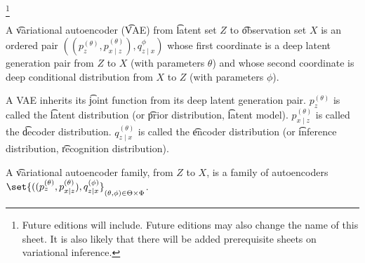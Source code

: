 
\footnote{Future editions will include. Future editions may also change the name of this sheet. It is also likely that there will be added prerequisite sheets on variational inference.}


A \t{variational autoencoder} (\t{VAE}) from \t{latent set} $Z$ to \t{observation set} $X$ is an ordered pair
$((p_{z}^{(\theta)}, p^{(\theta)}_{x \mid z}),  q^{\phi}_{z \mid x})$
whose first coordinate is a deep latent generation pair from $Z$ to $X$ (with parameters $\theta$) and whose second coordinate is deep conditional distribution from $X$ to $Z$ (with parameters $\phi$).

A VAE inherits its \t{joint function} from its deep latent generation pair. 
$p_z^{(\theta)}$ is called the \t{latent distribution} (or \t{prior distribution}, \t{latent model}).
$p_{x \mid z}^{(\theta)}$ is called the \t{decoder distribution}. 
$q_{z \mid x}^{(\theta)}$ is called the \t{encoder distribution} (or \t{inference distribution}, \t{recognition distribution}).

A \t{variational autoencoder family}, from $Z$ to $X$, is a family of autoencoders  $\set{ ((p_{z}^{(\theta)}, p^{(\theta)}_{x \mid z}) ,  q_{z \mid x}^{(\phi)}}_{(\theta, \phi) \in \Theta \times \Phi}$.

\blankpage
